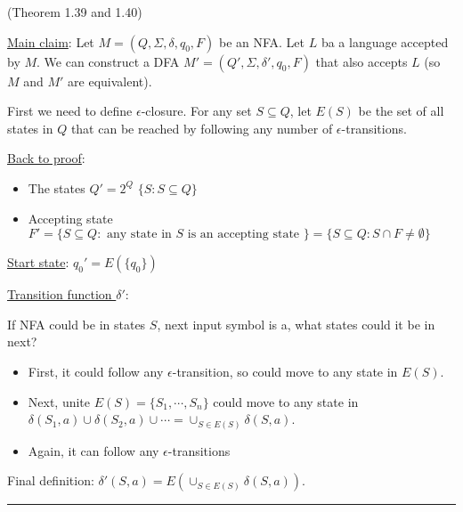 \documentclass[twoside]{article}
\newenvironment{proof}{{\bf Proof:}}{\hfill\rule{2mm}{2mm}}
\begin{document}
\begin{proof}
  (Theorem 1.39 and 1.40)
  
  \underline{Main claim}: Let $M = (Q, \Sigma, \delta, q_0, F)$ be an NFA. Let $L$ ba a language accepted by $M$. We can construct a DFA $M' = (Q', \Sigma, \delta', q_0, F)$ that also accepts $L$ (so $M$ and $M'$ are equivalent).
  
  First we need to define $\epsilon$-closure. For any set $S \subseteq Q$, let \underline{$E(S)$} be the set of all states in $Q$ that can be reached by following any number of $\epsilon$-transitions.
  
  \underline{Back to proof}:
  \begin{itemize}
    \item The states $Q' = 2^Q$ $\{S: S \subseteq Q\}$
    \item Accepting state $F' = \{S \subseteq Q: \text{ any state in $S$ is an accepting state }\} = \{S \subseteq Q: S \cap F \neq \emptyset \}$
  \end{itemize}
  
  \underline{Start state}: $q_0' = E(\{q_0\})$
  
  \underline{Transition function $\delta'$}:
  
  If NFA could be in states $S$, next input symbol is a, what states could it be in next?
  \begin{itemize}
    \item First, it could follow any $\epsilon$-transition, so could move to any state in $E(S)$.
    \item Next, unite $E(S) = \{S_1, \cdots, S_n\}$ could move to any state in $\delta(S_1, a) \cup \delta(S_2, a) \cup \cdots = \cup_{S \in E(S)} \delta(S, a)$.
    \item Again, it can follow any $\epsilon$-transitions
  \end{itemize}
  
  Final definition: $\delta'(S, a) = E(\cup_{S \in E(S)} \delta(S, a))$.
\end{proof}
\end{document}
